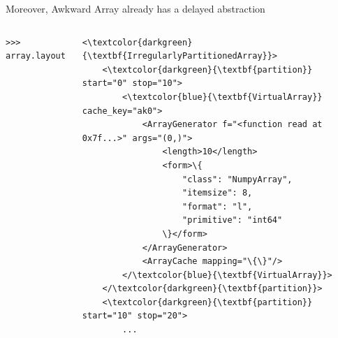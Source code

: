 \documentclass[aspectratio=169]{beamer}
\begin{document}
\begin{frame}[fragile]{Moreover, Awkward Array already has a delayed abstraction}
\small
\begin{columns}
\begin{verbatim}
>>> array.layout
\end{verbatim}
\vspace{-0.4 cm}
\begin{Verbatim}[commandchars=\\\{\}]
<\textcolor{darkgreen}{\textbf{IrregularlyPartitionedArray}}>
    <\textcolor{darkgreen}{\textbf{partition}} start="0" stop="10">
        <\textcolor{blue}{\textbf{VirtualArray}} cache_key="ak0">
            <ArrayGenerator f="<function read at 0x7f...>" args="(0,)">
                <length>10</length>
                <form>\{
                    "class": "NumpyArray",
                    "itemsize": 8,
                    "format": "l",
                    "primitive": "int64"
                \}</form>
            </ArrayGenerator>
            <ArrayCache mapping="\{\}"/>
        </\textcolor{blue}{\textbf{VirtualArray}}>
    </\textcolor{darkgreen}{\textbf{partition}}>
    <\textcolor{darkgreen}{\textbf{partition}} start="10" stop="20">
        ...
\end{Verbatim}
\end{columns}
\end{frame}
\end{document}
